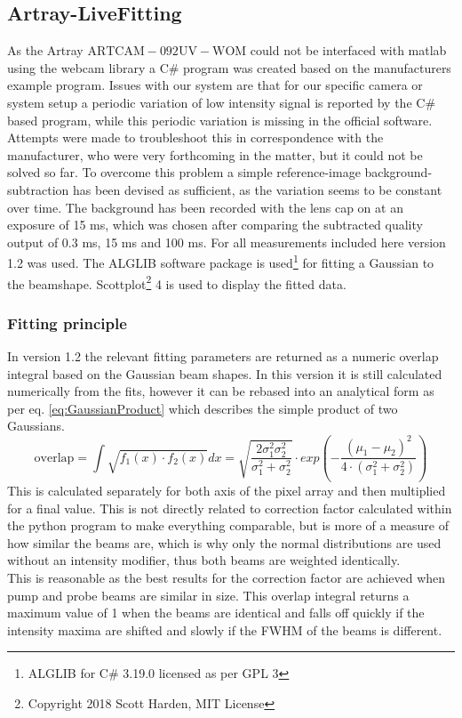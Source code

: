 \documentclass[twoside,openright]{scrreprt}
\begin{document}
{\subsection{Artray-LiveFitting}\label{sec:LiveFitting}
As the Artray $\mathrm{ARTCAM-092UV-WOM}$ could not be interfaced with matlab using the webcam library a C\# program was created based on the manufacturers example program.
Issues with our system are that for our specific camera or system setup a periodic variation of low intensity signal is reported by the C\# based program, while this periodic variation is missing in the official software. Attempts were made to troubleshoot this in correspondence with the manufacturer, who were very forthcoming in the matter, but it could not be solved so far. To overcome this problem a simple reference-image background-subtraction has been devised as sufficient, as the variation seems to be constant over time. The background has been recorded with the lens cap on at an exposure of 15 ms, which was chosen after comparing the subtracted quality output of 0.3 ms, 15 ms and 100 ms. 
\newline
For all measurements included here version 1.2 was used. The  ALGLIB software package is used\footnote{ALGLIB for C\# 3.19.0 licensed as per GPL 3} for fitting a Gaussian to the beamshape. Scottplot\footnote{Copyright 2018 Scott Harden, MIT License} 4 is used to display the fitted data.\\
\subsubsection{Fitting principle}
In version 1.2 the relevant fitting parameters are returned as a numeric overlap integral based on the Gaussian beam shapes. In this version it is still calculated numerically from the fits, however it can be rebased into an analytical form as per eq. \ref{eq:GaussianProduct} which describes the simple product of two Gaussians.
\begin{equation}
\mathrm{overlap} = \int \sqrt{f_1(x)\cdot f_2(x)}dx =  \sqrt{\frac{2 \sigma_1^2\sigma_2^2}{\sigma_1^2+\sigma_2^2}}\cdot exp\left(-\frac{\left(\mu_1-\mu_2\right)^2}{4\cdot \left(\sigma_1^2 + \sigma_2^2\right)}\right)\label{eq:GaussianProdcut}
\end{equation}
This is calculated separately for both axis of the pixel array and then multiplied for a final value. 
This is not directly related to correction factor calculated within the python program to make everything comparable, but is more of a measure of how similar the beams are, which is why only the normal distributions are used without an intensity modifier, thus both beams are weighted identically. \\
This is reasonable as the best results for the correction factor are achieved when pump and probe beams are similar in size. This overlap integral returns a maximum value of 1 when the beams are identical and falls off quickly if the intensity maxima are shifted and slowly if the FWHM of the beams is different.\\
}
\end{document}
